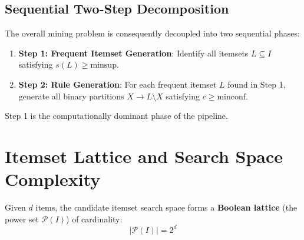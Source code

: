 \subsection{Sequential Two-Step Decomposition}
The overall mining problem is consequently decoupled into two sequential phases:
\begin{enumerate}
    \item \textbf{Step 1: Frequent Itemset Generation}: Identify all itemsets $L \subseteq I$ satisfying $s(L) \ge \mathrm{minsup}$.
    \item \textbf{Step 2: Rule Generation}: For each frequent itemset $L$ found in Step 1, generate all binary partitions $X \rightarrow L \setminus X$ satisfying $c \ge \mathrm{minconf}$.
\end{enumerate}

Step 1 is the computationally dominant phase of the pipeline.

\section{Itemset Lattice and Search Space Complexity}
\label{sec:dm-itemset-lattice}

Given $d$ items, the candidate itemset search space forms a \textbf{Boolean lattice} (the power set $\mathcal{P}(I)$) of cardinality:
\begin{equation}
|\mathcal{P}(I)| = 2^d
\end{equation}

